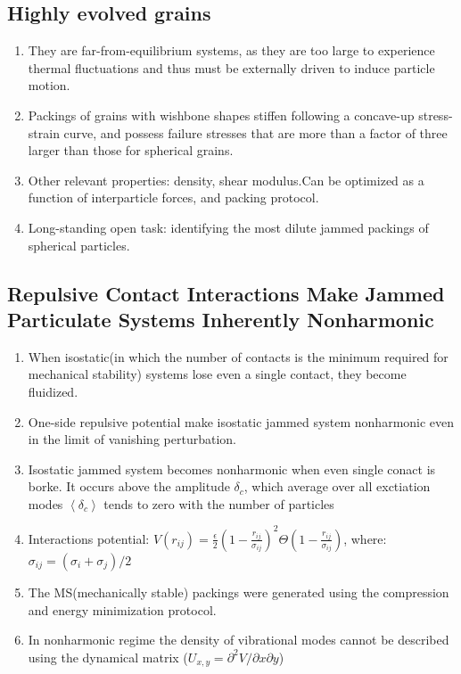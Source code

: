 \documentclass[10pt,a4paper]{article}
\begin{document}
\subsection{Highly evolved grains \cite{ohern:13}}
\begin{enumerate}
 \item They are far-from-equilibrium systems, as they are too large to experience thermal fluctuations and thus must be externally driven to induce particle motion.
 \item Packings of grains with wishbone shapes stiffen following a concave-up stress-strain curve, 
 and possess failure stresses that are more than a factor of three larger than those for spherical grains.
 \item Other relevant properties: density, shear modulus.Can be optimized as a function of interparticle forces, and packing protocol.
 \item Long-standing open task: identifying the most dilute jammed packings of spherical particles.
\end{enumerate}

\subsection{Repulsive Contact Interactions Make Jammed Particulate Systems Inherently Nonharmonic\cite{schreck:11}}
\begin{enumerate}
 \item When isostatic(in which the number of contacts is the minimum required for mechanical stability) systems lose even a single contact, they become fluidized.
 \item One-side repulsive potential make isostatic jammed system nonharmonic even in the limit of vanishing perturbation.
 \item Isostatic jammed system becomes nonharmonic when even single conact is borke. It occurs above the amplitude $\delta_c$, which average over all exctiation modes $\left<\delta_c\right>$ tends to zero with the number of particles
 \item Interactions potential: $V(r_{ij}) = \frac{\epsilon}{2} \left( 1 - \frac{r_{ij}}{\sigma_{ij}} \right)^2 \Theta\left( 1 - \frac{r_{ij}}{\sigma_{ij}} \right)$, where: $\sigma_{ij} = (\sigma_i + \sigma_j)/2$
 \item The MS(mechanically stable) packings were generated using the compression and energy minimization protocol.
 \item In nonharmonic regime the density of vibrational modes cannot be described using the dynamical matrix ($U_{x,y} = \partial^2 V / \partial x\partial y$)
\end{enumerate}
\end{document}
